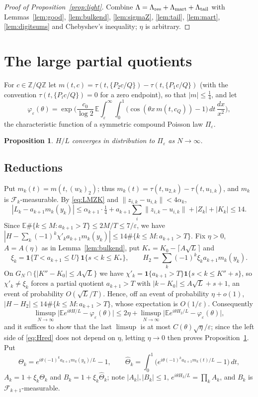 \documentclass[11pt]{amsart}
\newtheorem{proposition}[theorem]{Proposition}
\theoremstyle{definition}
\numberwithin{equation}{section}
\newcommand{\Z}{\mathbb{Z}}
\newcommand{\E}{\mathbb{E}}
\newcommand{\cF}{\mathcal{F}}
\newcommand{\fr}[1]{\{#1\}}
\newcommand{\eps}{\varepsilon}
\newcommand{\ind}{\mathbf{1}}
\begin{document}
\begin{proof}[Proof of Proposition~\ref{prop:light}]
Combine $\Lambda=\Lambda_{\rm res}+\Lambda_{\rm mart}+\Lambda_{\rm tail}$ with Lemmas~\ref{lem:good}, \ref{lem:bulkend}, \ref{lem:sigmaZ}, \ref{lem:tail}, \ref{lem:mart},
\ref{lem:digitsums} and Chebyshev's inequality; $\eta$ is arbitrary.
\end{proof}
\section{The large partial quotients}\label{sec:heavy}

For $c\in\Z/Q\Z$ let $m(t,c)=\tau(t,\fr{P_2c/Q})-\tau(t,\fr{P_1c/Q})$ (with the convention $\tau(t,\fr{P_ic/Q})=0$ for a zero endpoint), so that
$|m|\le\frac14$, and let
\[
\varphi_\eps(\theta)=\exp\Big(\frac{c_0}{\log2}\,\E\int_\eps^\infty\!\!\int_0^1\big(\cos(\theta x\,m(t,c_Q))-1\big)\,dt\,\frac{dx}{x^2}\Big),
\]
the characteristic function of a symmetric compound Poisson law $\Pi_\eps$.

\begin{proposition}\label{prop:heavy}
$H/L$ converges in distribution to $\Pi_\eps$ as $N\to\infty$.
\end{proposition}

\subsection*{Reductions}
Put $m_k(t)=m(t,(w_k)_2)$; thus $m_k(t)=\tau(t,u_{2,k})-\tau(t,u_{1,k})$, and $m_k$ is $\cF_k$-measurable. By \eqref{eq:LMZK} and
$\|z_{i,k}-u_{i,k}\|<4\alpha_k$,
\[
|L_k-a_{k+1}m_k(y_k)|\le\alpha_{k+1}\cdot\tfrac14+a_{k+1}\sum_i\|z_{i,k}-u_{i,k}\|+|Z_k|+|K_k|\le14 .
\]
Since $\E\#\{k\le M:a_{k+1}>T\}\le2M/T\le7/\eps$, we have $|H-\sum_k(-1)^k\chi'_ka_{k+1}m_k(y_k)|\le14\#\{k\le M:a_{k+1}>T\}$. Fix $\eta>0$, $A=A(\eta)$ as in
Lemma~\ref{lem:bulkend}, put $K_*=K_0-\lceil A\sqrt L\rceil$ and
\[
\xi_k=\ind\{T<a_{k+1}\le U\}\,\ind\{s<k\le K_*\},\qquad H_2=\sum_k(-1)^k\xi_ka_{k+1}m_k(y_k).
\]
On $G_N\cap\{|K''-K_0|\le A\sqrt L\}$ we have $\chi'_k=\ind\{a_{k+1}>T\}\ind\{s<k\le K''+s\}$, so $\chi'_k\ne\xi_k$ forces a partial quotient
$a_{k+1}>T$ with $|k-K_0|\le A\sqrt L+s+1$, an event of probability $O(\sqrt L/T)$. Hence, off an event of probability $\eta+o(1)$,
$|H-H_2|\le14\#\{k\le M:a_{k+1}>T\}$, whose expectation is $O(1/\eps)$. Consequently
\begin{equation}\label{eq:Hred}
\limsup_{N\to\infty}\big|\E e^{i\theta H/L}-\varphi_\eps(\theta)\big|\le2\eta+\limsup_{N\to\infty}\big|\E e^{i\theta H_2/L}-\varphi_\eps(\theta)\big|,
\end{equation}
and it suffices to show that the last $\limsup$ is at most $C(\theta)\sqrt\eta/\eps$; since the left side of \eqref{eq:Hred} does not depend on
$\eta$, letting $\eta\to0$ then proves Proposition~\ref{prop:heavy}. Put
\[
\Theta_k=e^{i\theta(-1)^ka_{k+1}m_k(y_k)/L}-1,\qquad \hat\Theta_k=\int_0^1\big(e^{i\theta(-1)^ka_{k+1}m_k(t)/L}-1\big)\,dt,
\]
$A_k=1+\xi_k\Theta_k$ and $B_k=1+\xi_k\hat\Theta_k$; note $|A_k|,|B_k|\le1$, $e^{i\theta H_2/L}=\prod_kA_k$, and $B_k$ is $\cF_{k+1}$-measurable.
\end{document}
